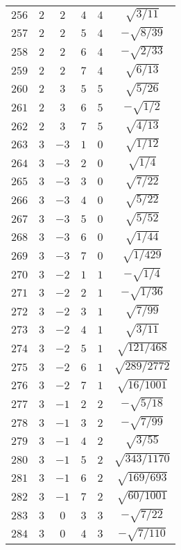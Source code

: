 \begin{table}
\begin{center}
\begin{tabular}{|c|c|c|c|c|c|}
$256$ & $2$ & $2$ & $4$ & $4$ & $\sqrt{3/11}$ \\ 
$257$ & $2$ & $2$ & $5$ & $4$ & $-\sqrt{8/39}$ \\ 
$258$ & $2$ & $2$ & $6$ & $4$ & $-\sqrt{2/33}$ \\ 
$259$ & $2$ & $2$ & $7$ & $4$ & $\sqrt{6/13}$ \\ 
$260$ & $2$ & $3$ & $5$ & $5$ & $\sqrt{5/26}$ \\ 
$261$ & $2$ & $3$ & $6$ & $5$ & $-\sqrt{1/2}$ \\ 
$262$ & $2$ & $3$ & $7$ & $5$ & $\sqrt{4/13}$ \\ 
$263$ & $3$ & $-3$ & $1$ & $0$ & $\sqrt{1/12}$ \\ 
$264$ & $3$ & $-3$ & $2$ & $0$ & $\sqrt{1/4}$ \\ 
$265$ & $3$ & $-3$ & $3$ & $0$ & $\sqrt{7/22}$ \\ 
$266$ & $3$ & $-3$ & $4$ & $0$ & $\sqrt{5/22}$ \\ 
$267$ & $3$ & $-3$ & $5$ & $0$ & $\sqrt{5/52}$ \\ 
$268$ & $3$ & $-3$ & $6$ & $0$ & $\sqrt{1/44}$ \\ 
$269$ & $3$ & $-3$ & $7$ & $0$ & $\sqrt{1/429}$ \\ 
$270$ & $3$ & $-2$ & $1$ & $1$ & $-\sqrt{1/4}$ \\ 
$271$ & $3$ & $-2$ & $2$ & $1$ & $-\sqrt{1/36}$ \\ 
$272$ & $3$ & $-2$ & $3$ & $1$ & $\sqrt{7/99}$ \\ 
$273$ & $3$ & $-2$ & $4$ & $1$ & $\sqrt{3/11}$ \\ 
$274$ & $3$ & $-2$ & $5$ & $1$ & $\sqrt{121/468}$ \\ 
$275$ & $3$ & $-2$ & $6$ & $1$ & $\sqrt{289/2772}$ \\ 
$276$ & $3$ & $-2$ & $7$ & $1$ & $\sqrt{16/1001}$ \\ 
$277$ & $3$ & $-1$ & $2$ & $2$ & $-\sqrt{5/18}$ \\ 
$278$ & $3$ & $-1$ & $3$ & $2$ & $-\sqrt{7/99}$ \\ 
$279$ & $3$ & $-1$ & $4$ & $2$ & $\sqrt{3/55}$ \\ 
$280$ & $3$ & $-1$ & $5$ & $2$ & $\sqrt{343/1170}$ \\ 
$281$ & $3$ & $-1$ & $6$ & $2$ & $\sqrt{169/693}$ \\ 
$282$ & $3$ & $-1$ & $7$ & $2$ & $\sqrt{60/1001}$ \\ 
$283$ & $3$ & $0$ & $3$ & $3$ & $-\sqrt{7/22}$ \\ 
$284$ & $3$ & $0$ & $4$ & $3$ & $-\sqrt{7/110}$ \\ 

\end{tabular}
\end{center}
\end{table}
